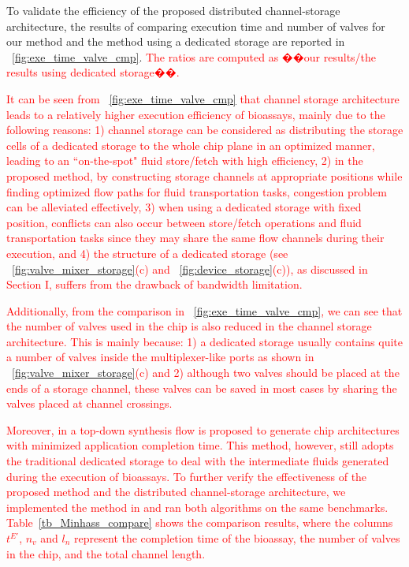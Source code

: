 To validate the efficiency of the proposed distributed channel-storage architecture, the results of comparing execution time and number of valves for our method and the method using a dedicated storage are reported in \figname~\ref{fig:exe_time_valve_cmp}.
\textcolor{red}{The ratios are computed as ��our results/the results using dedicated storage��.}

\textcolor{red}{It can be seen from \figname~\ref{fig:exe_time_valve_cmp} that channel storage architecture leads to a relatively higher execution efficiency of bioassays, mainly due to the following reasons: 1) channel storage can be considered as distributing the storage cells of a dedicated storage to the whole chip plane in an optimized manner, leading to an ``on-the-spot" fluid store/fetch with high efficiency, 2) in the proposed method, by constructing storage channels at appropriate positions while finding optimized flow paths for fluid transportation tasks, congestion problem can be alleviated effectively, 3) when using a dedicated storage with fixed position, conflicts can also occur between store/fetch operations and fluid transportation tasks since they may share the same flow channels during their execution, and 4) the structure of a dedicated storage (see \figname~\ref{fig:valve_mixer_storage}(c) and \figname~\ref{fig:device_storage}(c)), as discussed in Section I, suffers from the drawback of bandwidth limitation.}

\textcolor{red}{Additionally, from the comparison in \figname~\ref{fig:exe_time_valve_cmp}, we can see that the number of valves used in the chip is also reduced in the channel storage architecture. This is mainly because: 1) a dedicated storage usually contains quite a number of valves inside the multiplexer-like ports as shown in \figname~\ref{fig:valve_mixer_storage}(c) and 2) although two valves should be placed at the ends of a storage channel, these valves can be saved in most cases by sharing the valves placed at channel crossings.}

\textcolor{red}{
  Moreover, in \cite{minhass2012architectural} a top-down synthesis flow is proposed to generate chip architectures with minimized application completion time. This method, however, still adopts the traditional dedicated storage to deal with the intermediate fluids generated during the execution of bioassays. To further verify the effectiveness of the proposed method and the distributed channel-storage architecture, we implemented the method in \cite{minhass2012architectural} and ran both algorithms on the same benchmarks. Table~\ref{tb_Minhass_compare} shows the comparison results, where the columns $t^{E'}$, $n_v$ and $l_n$ represent the completion time of the bioassay, the number of valves in the chip, and the total channel length.}

